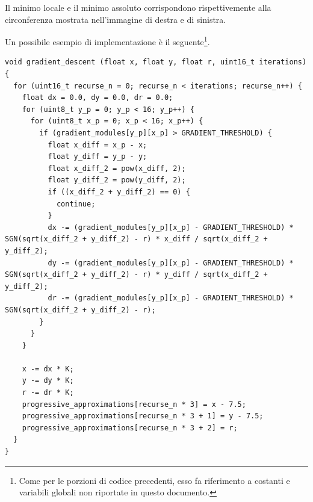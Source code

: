\documentclass[12pt]{article}
\newenvironment{changemargin}[2]{%
    \begin{list}{}{%
    \setlength{\topsep}{0pt}%
    \setlength{\leftmargin}{#1}%
    \setlength{\rightmargin}{#2}%
    \setlength{\listparindent}{\parindent}%
    \setlength{\itemindent}{\parindent}%
    \setlength{\parsep}{\parskip}%
    }%
    \item[]}{\end{list}}
\begin{document}
        Il minimo locale e il minimo assoluto corrispondono rispettivemente alla circonferenza mostrata nell'immagine di destra e di sinistra.

        Un possibile esempio di implementazione è il seguente\footnote{Come per le porzioni di codice precedenti, esso fa riferimento a costanti e variabili globali non riportate in questo documento.}.
        
        \begin{changemargin}{-2cm}{-2cm}
        \begin{lstlisting}[label={list:gradient_descent}, style=Arduino, caption=Ricerca minimi - discesa del gradiente, basicstyle=\scriptsize]
void gradient_descent (float x, float y, float r, uint16_t iterations) {
  for (uint16_t recurse_n = 0; recurse_n < iterations; recurse_n++) {
    float dx = 0.0, dy = 0.0, dr = 0.0;
    for (uint8_t y_p = 0; y_p < 16; y_p++) {
      for (uint8_t x_p = 0; x_p < 16; x_p++) {
        if (gradient_modules[y_p][x_p] > GRADIENT_THRESHOLD) {
          float x_diff = x_p - x;
          float y_diff = y_p - y;
          float x_diff_2 = pow(x_diff, 2);
          float y_diff_2 = pow(y_diff, 2);
          if ((x_diff_2 + y_diff_2) == 0) {
            continue;
          }
          dx -= (gradient_modules[y_p][x_p] - GRADIENT_THRESHOLD) * SGN(sqrt(x_diff_2 + y_diff_2) - r) * x_diff / sqrt(x_diff_2 + y_diff_2);
          dy -= (gradient_modules[y_p][x_p] - GRADIENT_THRESHOLD) * SGN(sqrt(x_diff_2 + y_diff_2) - r) * y_diff / sqrt(x_diff_2 + y_diff_2);
          dr -= (gradient_modules[y_p][x_p] - GRADIENT_THRESHOLD) * SGN(sqrt(x_diff_2 + y_diff_2) - r);
        }
      }
    }

    x -= dx * K;
    y -= dy * K;
    r -= dr * K;
    progressive_approximations[recurse_n * 3] = x - 7.5;
    progressive_approximations[recurse_n * 3 + 1] = y - 7.5;
    progressive_approximations[recurse_n * 3 + 2] = r;
  }
}       \end{lstlisting}
        \end{changemargin}
  
   
    \vfill
    \let\thefootnote\relax{}
\end{document}
